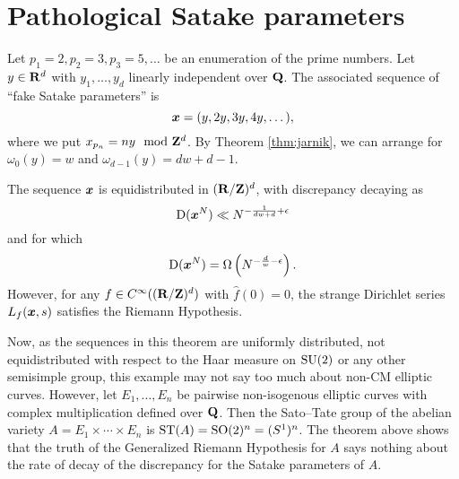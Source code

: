 \section{Pathological Satake parameters}

Let $p_1 = 2, p_2 = 3, p_3 = 5, \dots$ be an enumeration of the prime numbers. 
Let $y\in \mathbf{R}^d$ with $y_1,\dots,y_d$ linearly independent over $\mathbf{Q}$. The 
associated sequence of ``fake Satake parameters'' is 
\[
	{\boldsymbol x} = (y, 2y, 3 y, 4 y, \dots) ,
\]
where we put $x_{p_n} = n y\mod {\mathbf{Z}}^d$. By Theorem \ref{thm:jarnik}, we can 
arrange for $\omega_0(y) = w$ and $\omega_{d-1}(y) = d w + d - 1$. 

\begin{theorem}
The sequence ${\boldsymbol x}$ is equidistributed in $(\mathbf{R}/\mathbf{Z})^d$, with discrepancy 
decaying as 
\[
	\operatorname{D}({\boldsymbol x}^N) \ll N^{-\frac{1}{d w+d} + \epsilon} 
\]
and for which 
\[
	\operatorname{D}({\boldsymbol x}^N) = \Omega\left(N^{-\frac{d}{w} - \epsilon}\right) .
\]
However, for any $f\in C^\infty((\mathbf{R}/\mathbf{Z})^d)$ with $\widehat f(0)=0$, the 
strange Dirichlet series  $L_f({\boldsymbol x},s)$ satisfies the Riemann Hypothesis. 
\end{theorem}

Now, as the sequences in this theorem are uniformly distributed, not 
equidistributed with respect to the Haar measure on $\operatorname{SU}(2)$ or any other 
semisimple group, this example may not say too much about non-CM elliptic 
curves. However, let $E_1,\dots,E_n$ be pairwise non-isogenous elliptic curves 
with complex multiplication defined over $\mathbf{Q}$. Then the Sato--Tate group of 
the abelian variety $A = E_1\times \cdots \times E_n$ is 
$\mathrm{ST}(A) = \operatorname{SO}(2)^n = (S^1)^n$. The theorem above shows that the truth of the 
Generalized Riemann Hypothesis for $A$ says nothing about the rate of decay of 
the discrepancy for the Satake parameters of $A$. 
